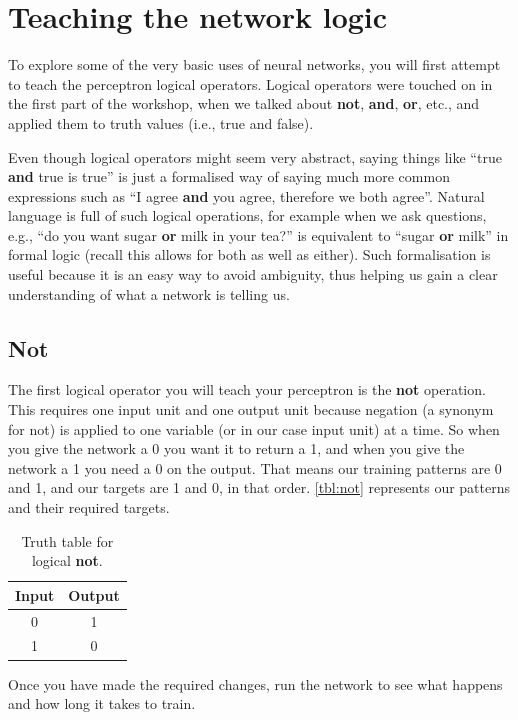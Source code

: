 \documentclass[a4paper,10pt]{article}
\begin{document}
\section{Teaching the network logic}
To explore some of the  very basic uses of neural networks, you will first attempt to teach the perceptron logical operators. Logical operators were touched on in the first part of the workshop, when we talked about \textbf{not}, \textbf{and}, \textbf{or}, etc., and applied them to truth values (i.e., true and false).

Even though logical operators might seem very abstract, saying things like ``true \textbf{and} true is true'' is just a formalised way of saying much more common expressions such as ``I agree \textbf{and} you agree, therefore we both agree''. Natural language is full of such logical operations, for example when we ask questions, e.g., ``do you want sugar \textbf{or} milk in your tea?'' is equivalent to ``sugar \textbf{or} milk'' in formal logic (recall this allows for both as well as either). Such formalisation is useful because it is an easy way to avoid ambiguity, thus helping us gain a clear understanding of what a network is telling us. 

\subsection{Not}

The first logical operator you will teach your perceptron is the \textbf{not} operation. This requires one input unit and one output unit because negation (a synonym for not) is applied to one variable (or in our case input unit) at a time. So when you give the network a 0 you want it to return a 1, and when you give the network a 1 you need a 0 on the output. That means our training patterns are 0 and 1, and our targets are 1 and 0, in that order. \autoref{tbl:not} represents our patterns and their required targets. 

\begin{table}[hb]
 \centering
 \begin{tabular}[t]{cc}
Input & Output\\ \hline
0 & 1\\
1 & 0
\end{tabular} \caption{Truth table for logical \textbf{not}.}
 \label{tbl:not}
\end{table}

Once you have made the required changes, run the network to see what happens and how long it takes to train. 
\end{document}
